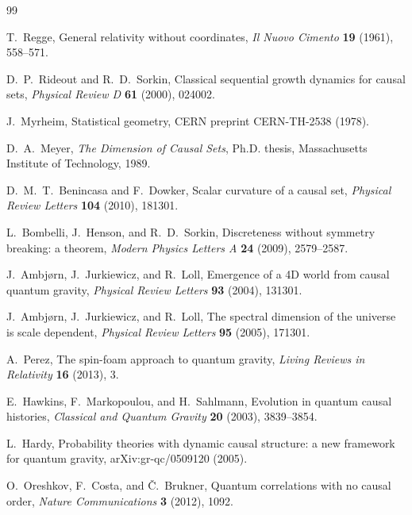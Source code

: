 \documentclass[11pt]{article}
\numberwithin{equation}{section}
\theoremstyle{definition}
\theoremstyle{remark}
\begin{document}
\begin{thebibliography}{99}

T.~Regge,
\newblock General relativity without coordinates,
\newblock \emph{Il Nuovo Cimento} \textbf{19} (1961), 558--571.

D.~P.~Rideout and R.~D.~Sorkin,
\newblock Classical sequential growth dynamics for causal sets,
\newblock \emph{Physical Review D} \textbf{61} (2000), 024002.

J.~Myrheim,
\newblock Statistical geometry,
\newblock CERN preprint CERN-TH-2538 (1978).

D.~A.~Meyer,
\newblock \emph{The Dimension of Causal Sets},
\newblock Ph.D. thesis, Massachusetts Institute of Technology, 1989.

D.~M.~T.~Benincasa and F.~Dowker,
\newblock Scalar curvature of a causal set,
\newblock \emph{Physical Review Letters} \textbf{104} (2010), 181301.

L.~Bombelli, J.~Henson, and R.~D.~Sorkin,
\newblock Discreteness without symmetry breaking: a theorem,
\newblock \emph{Modern Physics Letters A} \textbf{24} (2009), 2579--2587.

J.~Ambj{\o}rn, J.~Jurkiewicz, and R.~Loll,
\newblock Emergence of a 4D world from causal quantum gravity,
\newblock \emph{Physical Review Letters} \textbf{93} (2004), 131301.

J.~Ambj{\o}rn, J.~Jurkiewicz, and R.~Loll,
\newblock The spectral dimension of the universe is scale dependent,
\newblock \emph{Physical Review Letters} \textbf{95} (2005), 171301.

A.~Perez,
\newblock The spin-foam approach to quantum gravity,
\newblock \emph{Living Reviews in Relativity} \textbf{16} (2013), 3.

E.~Hawkins, F.~Markopoulou, and H.~Sahlmann,
\newblock Evolution in quantum causal histories,
\newblock \emph{Classical and Quantum Gravity} \textbf{20} (2003), 3839--3854.

L.~Hardy,
\newblock Probability theories with dynamic causal structure: a new framework
for quantum gravity,
\newblock arXiv:gr-qc/0509120 (2005).

O.~Oreshkov, F.~Costa, and {\v C}.~Brukner,
\newblock Quantum correlations with no causal order,
\newblock \emph{Nature Communications} \textbf{3} (2012), 1092.


\end{thebibliography}
\end{document}
